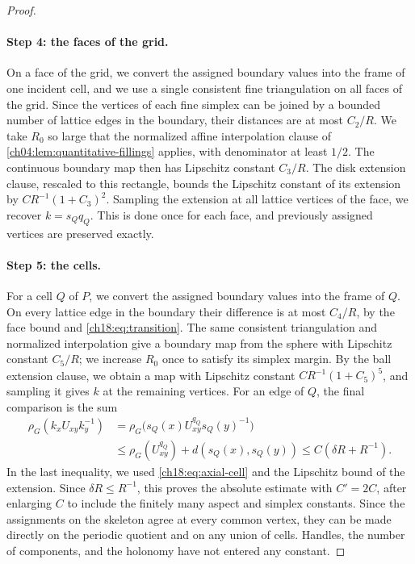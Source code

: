 \begin{proof}
\paragraph{Step 4: the faces of the grid.}
On a face of the grid, we convert the assigned boundary values into the frame of one incident cell, and we use a single consistent fine triangulation on all faces of the grid. Since the vertices of each fine simplex can be joined by a bounded number of lattice edges in the boundary, their distances are at most $C_2/R$. We take $R_0$ so large that the normalized affine interpolation clause of \cref{ch04:lem:quantitative-fillings} applies, with denominator at least $1/2$. The continuous boundary map then has Lipschitz constant $C_3/R$. The disk extension clause, rescaled to this rectangle, bounds the Lipschitz constant of its extension by $CR^{-1}(1+C_3)^2$. Sampling the extension at all lattice vertices of the face, we recover $k=s_Qq_Q$. This is done once for each face, and previously assigned vertices are preserved exactly.

\paragraph{Step 5: the cells.}
For a cell $Q$ of $P$, we convert the assigned boundary values into the frame of $Q$. On every lattice edge in the boundary their difference is at most $C_4/R$, by the face bound and \eqref{ch18:eq:transition}. The same consistent triangulation and normalized interpolation give a boundary map from the sphere with Lipschitz constant $C_5/R$; we increase $R_0$ once to satisfy its simplex margin. By the ball extension clause, we obtain a map with Lipschitz constant $CR^{-1}(1+C_5)^5$, and sampling it gives $k$ at the remaining vertices. For an edge of $Q$, the final comparison is the sum
\begin{equation}\label{ch18:eq:final-sum}
 \begin{split}
 \rho_G(k_xU_{xy}k_y^{-1})
 &=\rho_G\bigl(s_Q(x)U_{xy}^{q_Q}s_Q(y)^{-1}\bigr)\\
 &\le \rho_G(U_{xy}^{q_Q})+d(s_Q(x),s_Q(y))
 \le C(\delta R+R^{-1}).
 \end{split}
\end{equation}
In the last inequality, we used \eqref{ch18:eq:axial-cell} and the Lipschitz bound of the extension. Since $\delta R\le R^{-1}$, this proves the absolute estimate with $C'=2C$, after enlarging $C$ to include the finitely many aspect and simplex constants. Since the assignments on the skeleton agree at every common vertex, they can be made directly on the periodic quotient and on any union of cells. Handles, the number of components, and the holonomy have not entered any constant.


\end{proof}
